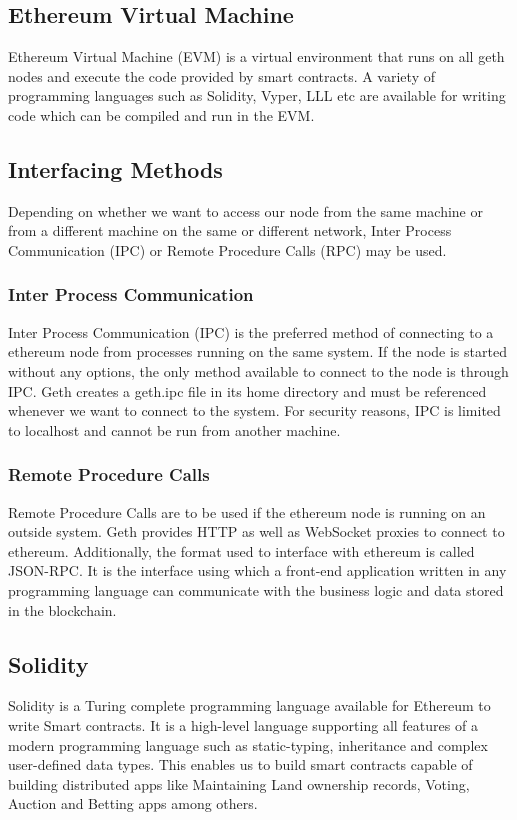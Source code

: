 \documentclass[11pt,openright]{report}
\begin{document}
\subsection{Ethereum Virtual Machine}
Ethereum Virtual Machine (EVM) is a virtual environment that runs on all geth nodes and execute the code provided by smart contracts. A variety of programming languages such as Solidity, Vyper, LLL etc are available for writing code which can be compiled and run in the EVM.

\subsection{Interfacing Methods}
Depending on whether we want to access our node from the same machine or from a different machine on the same or different network, Inter Process Communication (IPC) or Remote Procedure Calls (RPC) may be used.

\subsubsection{Inter Process Communication}
Inter Process Communication (IPC) is the preferred method of connecting to a ethereum node from processes running on the same system. If the node is started without any options, the only method available to connect to the node is through IPC. Geth creates a geth.ipc file in its home directory and must be referenced whenever we want to connect to the system. For security reasons, IPC is limited to localhost and cannot be run from another machine.

\subsubsection{Remote Procedure Calls}
Remote Procedure Calls are to be used if the ethereum node is running on an outside system. Geth provides HTTP as well as WebSocket proxies to connect to ethereum. Additionally, the format used to interface with ethereum is called JSON-RPC. It is the interface using which a front-end application written in any programming language can communicate with the business logic and data stored in the blockchain.

\subsection{Solidity}
Solidity is a Turing complete programming language available for Ethereum to write Smart contracts. It is a high-level language supporting all features of a modern programming language such as static-typing, inheritance and complex user-defined data types. This enables us to build smart contracts capable of building distributed apps like Maintaining Land ownership records, Voting, Auction and Betting apps among others.
\end{document}
